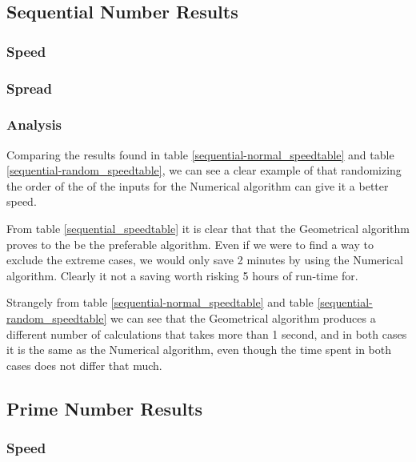 \subsection{Sequential Number Results}

\subsubsection*{Speed}
\FloatBarrier



\FloatBarrier
\subsubsection*{Spread}
\FloatBarrier



\FloatBarrier
\subsubsection*{Analysis}
Comparing the results found in table \ref{sequential-normal_speedtable} and table \ref{sequential-random_speedtable}, we can see a clear example of that randomizing the order of the of the inputs for the Numerical algorithm can give it a better speed.

From table \ref{sequential_speedtable} it is clear that that the Geometrical algorithm proves to the be the preferable algorithm. Even if we were to find a way to exclude the extreme cases, we would only save 2 minutes by using the Numerical algorithm. Clearly it not a saving worth risking 5 hours of run-time for. 

Strangely from table \ref{sequential-normal_speedtable} and table \ref{sequential-random_speedtable} we can see that the Geometrical algorithm produces a different number of calculations that takes more than 1 second, and in both cases it is the same as the Numerical algorithm, even though the time spent in both cases does not differ that much.

\subsection{Prime Number Results}

\subsubsection*{Speed}
\label{prime_results}
\FloatBarrier



\FloatBarrier
